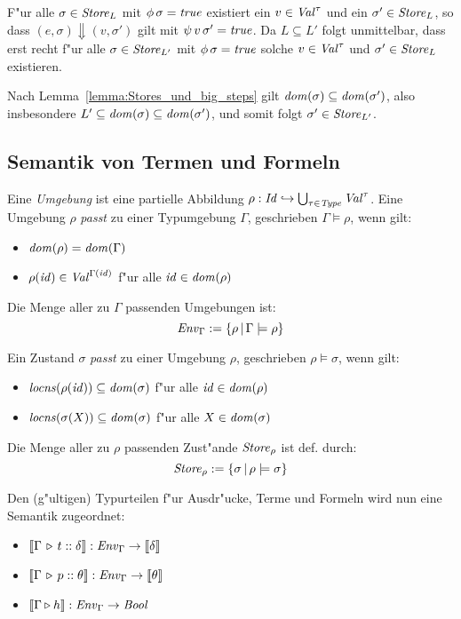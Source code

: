 \documentclass[12pt,a4paper,bigheadings]{scrartcl}
\newcommand{\semantic}[1]{\ensuremath{\llbracket#1\rrbracket}}
\newcommand{\locns}{\name{locns}}
\begin{document}
\begin{beweis}
  F"ur alle $\sigma \in {\text{\it Store\/}}_L$ mit $\phi\,\sigma = {\text{\it true\/}}$ existiert ein $v\in{\text{\it Val\/}}^\tau$ und
  ein $\sigma'\in{\text{\it Store\/}}_L$, so dass $(e,\sigma) \Downarrow (v,\sigma')$ gilt mit $\psi\,v\,\sigma'={\text{\it true\/}}$.
  Da $L \subseteq L'$ folgt unmittelbar, dass erst recht f"ur alle $\sigma\in{\text{\it Store\/}}_{L'}$ mit
  $\phi\,\sigma={\text{\it true\/}}$ solche $v\in{\text{\it Val\/}}^\tau$ und $\sigma'\in{\text{\it Store\/}}_L$ existieren.

  Nach Lemma~\ref{lemma:Stores_und_big_steps} gilt ${\text{\it dom\/}}(\sigma) \subseteq {\text{\it dom\/}}(\sigma')$, also
  insbesondere $L' \subseteq {\text{\it dom\/}}(\sigma) \subseteq {\text{\it dom\/}}(\sigma')$, und somit folgt
  $\sigma'\in{\text{\it Store\/}}_{L'}$.
\end{beweis}


\subsection{Semantik von Termen und Formeln}

Eine {\em Umgebung} ist eine partielle Abbildung $\rho:{\text{\it Id\/}}\hookrightarrow\bigcup_{\tau\in{\text{\it Type\/}}} {\text{\it Val\/}}^\tau$.
Eine Umgebung $\rho$ {\em passt} zu einer Typumgebung $\Gamma$, geschrieben $\Gamma \models \rho$,
wenn gilt:
\begin{itemize}
  \item ${\text{\it dom\/}}(\rho) = {\text{\it dom\/}}(\Gamma)$
  \item $\rho({\text{\it id\/}}) \in {\text{\it Val\/}}^{\Gamma({\text{\it id\/}})}$ f"ur alle ${\text{\it id\/}}\in{\text{\it dom\/}}(\rho)$
\end{itemize}
Die Menge aller zu $\Gamma$ passenden Umgebungen ist:
\[
  {\text{\it Env\/}}_\Gamma := \{\rho\,|\,\Gamma \models \rho\}
\]

\noindent
Ein Zustand $\sigma$ {\em passt} zu einer Umgebung $\rho$, geschrieben $\rho \models \sigma$,
wenn gilt:
\begin{itemize}
  \item $\locns(\rho(\id)) \subseteq \dom{\sigma}$ f"ur alle ${\text{\it id\/}}\in{\text{\it dom\/}}(\rho)$
  \item $\locns(\sigma(X)) \subseteq \dom{\sigma}$ f"ur alle $X\in{\text{\it dom\/}}(\sigma)$
\end{itemize}
Die Menge aller zu $\rho$ passenden Zust"ande ${\text{\it Store\/}}_\rho$ ist def. durch:
\[
  {\text{\it Store\/}}_\rho := \{\sigma\,|\,\rho\models\sigma\}
\]

\noindent
Den (g"ultigen) Typurteilen f"ur Ausdr"ucke, Terme und Formeln wird nun eine Semantik zugeordnet:
\begin{itemize}
  \item $\semantic{\Tj{\Gamma}{t}{\delta}}:\Env_\Gamma \to \semantic{\delta}$
  \item $\semantic{\Tj{\Gamma}{p}{\theta}}:\Env_\Gamma \to \semantic{\theta}$
  \item $\semantic{\Tjh{\Gamma}{h}}: \Env_\Gamma \to \Bool$
\end{itemize}
\end{document}
